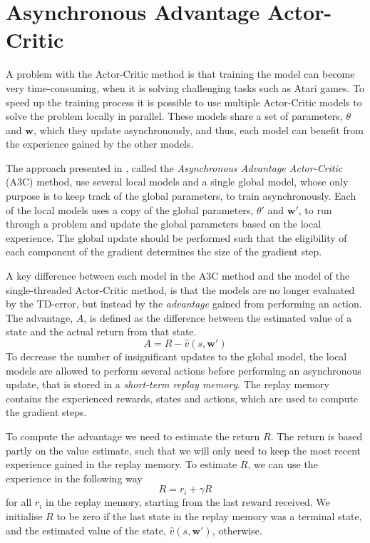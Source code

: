 \documentclass[11pt]{article}
\begin{document}

\section{Asynchronous Advantage Actor-Critic}\label{sec:a3c}

A problem with the Actor-Critic method is that training the model can become very time-consuming,
when it is solving challenging tasks such as Atari games.
To speed up the training process it is possible to use 
multiple Actor-Critic models to 
solve the problem locally in parallel.
These models share a set of parameters, $\theta$ and $\mathbf{w}$, which they update asynchronously,
and thus, each model can benefit from the experience gained by the other models.

The approach presented in \cite{a3c}, called the \textit{Asynchronous Advantage Actor-Critic} (A3C) method,
use several local models and a single global model, whose only purpose is to keep track of the global parameters,
to train asynchronously.
Each of the local models uses a copy of the global parameters, $\theta'$ and $\mathbf{w}'$, to run through a problem
and update the global parameters based on the local experience.
The global update should be performed such that
the eligibility of each component of the gradient determines the size of the
gradient step.

A key difference between each model in the A3C method and the model of the single-threaded Actor-Critic method,
is that the models are no longer evaluated by the TD-error,
but instead by the \textit{advantage} gained from performing an action.
The advantage, $A$, is defined as the difference between the estimated value of
a state and the actual return from that state.
\begin{equation}
    A = R - \hat{v}(s, \mathbf{w}')
\end{equation}
To decrease the number of insignificant updates to the global
model, the local models are allowed to perform several actions
before performing an asynchronous update, that is stored in a \textit{short-term
replay memory}.
The replay memory contains the experienced rewards, states and actions,
which are used to compute the gradient steps.

To compute the advantage we need to estimate the return $R$.
The return is based partly on the value estimate, such that we will only
need to keep the most recent experience gained in the replay memory.
To estimate $R$, we can use the experience in the following way
\begin{equation}
    R = r_i + \gamma R
\end{equation}
for all $r_i$ in the replay memory, starting from the last reward received.
We initialise $R$ to be zero if the last state in the replay memory was a terminal state,
and the estimated value of the state, $\hat{v}(s, \mathbf{w}')$, otherwise.
\end{document}
